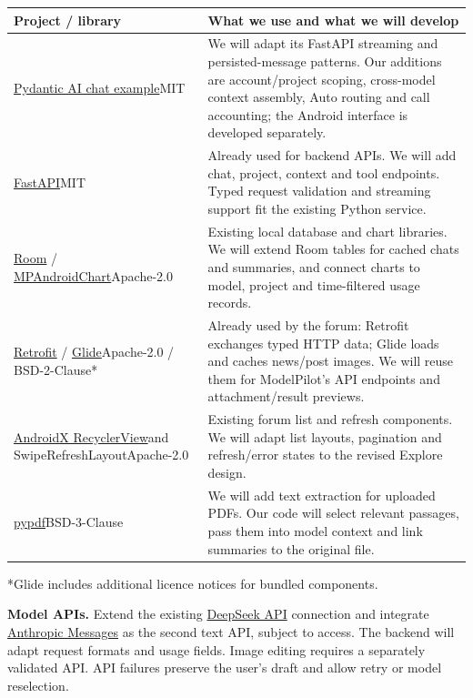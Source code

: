 \documentclass[10pt,a4paper]{article}
\newcommand{\smallnote}[1]{{\fontsize{9}{11}\selectfont\color{muted}#1\par}}
\newcommand{\tablehead}[1]{\rowcolor{pale}\sffamily\bfseries #1}
\begin{document}
{\fontsize{9.4}{11.3}\selectfont
\begin{tabularx}{\linewidth}{@{}L{40mm}Y@{}}
\toprule
\tablehead{Project / library} & \sffamily\bfseries What we use and what we will develop \\
\midrule
\href{https://ai.pydantic.dev/examples/chat-app/}{Pydantic AI chat example}\newline MIT & We will adapt its FastAPI streaming and persisted-message patterns. Our additions are account/project scoping, cross-model context assembly, Auto routing and call accounting; the Android interface is developed separately. \\
\addlinespace[3pt]
\href{https://github.com/fastapi/fastapi}{FastAPI}\newline MIT & Already used for backend APIs. We will add chat, project, context and tool endpoints. Typed request validation and streaming support fit the existing Python service. \\
\addlinespace[3pt]
\href{https://developer.android.com/training/data-storage/room}{Room} / \href{https://github.com/PhilJay/MPAndroidChart}{MPAndroidChart}\newline Apache-2.0 & Existing local database and chart libraries. We will extend Room tables for cached chats and summaries, and connect charts to model, project and time-filtered usage records. \\
\addlinespace[3pt]
\href{https://github.com/square/retrofit}{Retrofit} / \href{https://github.com/bumptech/glide}{Glide}\newline Apache-2.0 / BSD-2-Clause* & Already used by the forum: Retrofit exchanges typed HTTP data; Glide loads and caches news/post images. We will reuse them for ModelPilot's API endpoints and attachment/result previews. \\
\addlinespace[3pt]
\href{https://github.com/androidx/androidx}{AndroidX RecyclerView}\newline and SwipeRefreshLayout\newline Apache-2.0 & Existing forum list and refresh components. We will adapt list layouts, pagination and refresh/error states to the revised Explore design. \\
\addlinespace[3pt]
\href{https://github.com/py-pdf/pypdf}{pypdf}\newline BSD-3-Clause & We will add text extraction for uploaded PDFs. Our code will select relevant passages, pass them into model context and link summaries to the original file. \\
\bottomrule
\end{tabularx}}
\par\vspace{2pt}
\smallnote{*Glide includes additional licence notices for bundled components.}
\textbf{Model APIs.} Extend the existing \href{https://api-docs.deepseek.com/}{DeepSeek API} connection and integrate \href{https://github.com/anthropics/anthropic-sdk-python}{Anthropic Messages} as the second text API, subject to access. The backend will adapt request formats and usage fields. Image editing requires a separately validated API. API failures preserve the user's draft and allow retry or model reselection.
\end{document}
